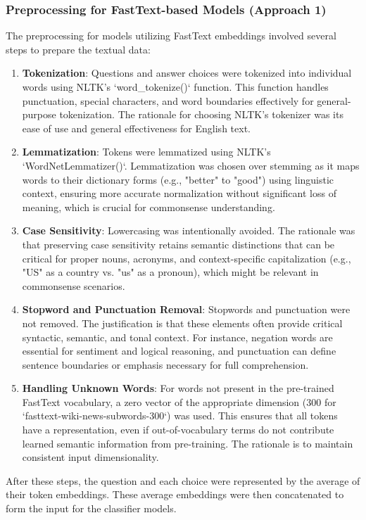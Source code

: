\documentclass[10.5pt]{article}
\begin{document}
\subsubsection{Preprocessing for FastText-based Models (Approach 1)}
The preprocessing for models utilizing FastText embeddings involved several steps to prepare the textual data:
\begin{enumerate}
    \item \textbf{Tokenization}: Questions and answer choices were tokenized into individual words using NLTK's `word\_tokenize()` function. This function handles punctuation, special characters, and word boundaries effectively for general-purpose tokenization. The rationale for choosing NLTK's tokenizer was its ease of use and general effectiveness for English text.
    \item \textbf{Lemmatization}: Tokens were lemmatized using NLTK's `WordNetLemmatizer()`. Lemmatization was chosen over stemming as it maps words to their dictionary forms (e.g., "better" to "good") using linguistic context, ensuring more accurate normalization without significant loss of meaning, which is crucial for commonsense understanding.
    \item \textbf{Case Sensitivity}: Lowercasing was intentionally avoided. The rationale was that preserving case sensitivity retains semantic distinctions that can be critical for proper nouns, acronyms, and context-specific capitalization (e.g., "US" as a country vs. "us" as a pronoun), which might be relevant in commonsense scenarios.
    \item \textbf{Stopword and Punctuation Removal}: Stopwords and punctuation were not removed. The justification is that these elements often provide critical syntactic, semantic, and tonal context. For instance, negation words are essential for sentiment and logical reasoning, and punctuation can define sentence boundaries or emphasis necessary for full comprehension.
    \item \textbf{Handling Unknown Words}: For words not present in the pre-trained FastText vocabulary, a zero vector of the appropriate dimension (300 for `fasttext-wiki-news-subwords-300`) was used. This ensures that all tokens have a representation, even if out-of-vocabulary terms do not contribute learned semantic information from pre-training. The rationale is to maintain consistent input dimensionality.
\end{enumerate}
After these steps, the question and each choice were represented by the average of their token embeddings. These average embeddings were then concatenated to form the input for the classifier models.
\end{document}
